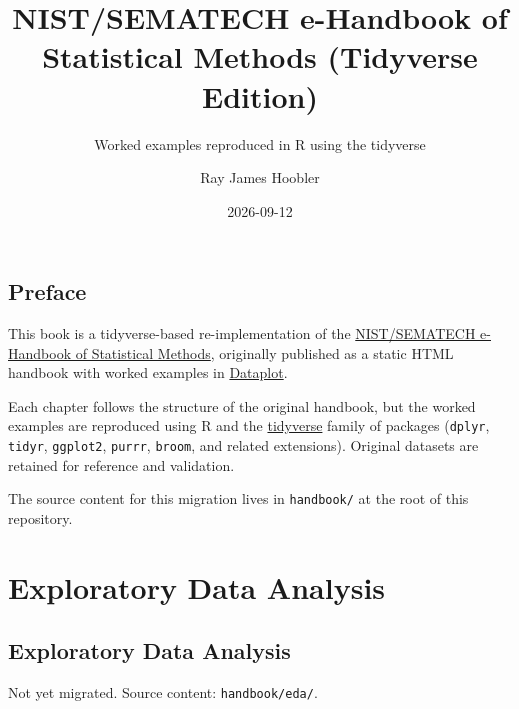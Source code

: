 \documentclass[
  letterpaper,
  DIV=11,
  numbers=noendperiod]{scrreprt}
\title{NIST/SEMATECH e-Handbook of Statistical Methods (Tidyverse
Edition)}
\subtitle{Worked examples reproduced in R using the tidyverse}
\author{Ray James Hoobler}
\date{2026-09-12}
\renewcommand*\contentsname{Table of contents}
\newcommand\contentsname{Table of contents}
\begin{document}
\maketitle

\renewcommand*\contentsname{Table of contents}
{
\setcounter{tocdepth}{2}
\tableofcontents
}


\chapter*{Preface}\label{preface}


This book is a tidyverse-based re-implementation of the
\href{https://www.itl.nist.gov/div898/handbook/}{NIST/SEMATECH
e-Handbook of Statistical Methods}, originally published as a static
HTML handbook with worked examples in
\href{https://www.itl.nist.gov/div898/software/dataplot/}{Dataplot}.

Each chapter follows the structure of the original handbook, but the
worked examples are reproduced using R and the
\href{https://www.tidyverse.org/}{tidyverse} family of packages
(\texttt{dplyr}, \texttt{tidyr}, \texttt{ggplot2}, \texttt{purrr},
\texttt{broom}, and related extensions). Original datasets are retained
for reference and validation.

The source content for this migration lives in \texttt{handbook/} at the
root of this repository.

\part{Exploratory Data Analysis}

\chapter{Exploratory Data Analysis}\label{sec-eda}

\begin{tcolorbox}[enhanced jigsaw, arc=.35mm, bottomrule=.15mm, bottomtitle=1mm, breakable, colback=white, colbacktitle=quarto-callout-note-color!10!white, colframe=quarto-callout-note-color-frame, coltitle=black, left=2mm, leftrule=.75mm, opacityback=0, opacitybacktitle=0.6, rightrule=.15mm, title=\textcolor{quarto-callout-note-color}{\faInfo}\hspace{0.5em}{Status}, titlerule=0mm, toprule=.15mm, toptitle=1mm]

Not yet migrated. Source content: \texttt{handbook/eda/}.

\end{tcolorbox}
\end{document}
